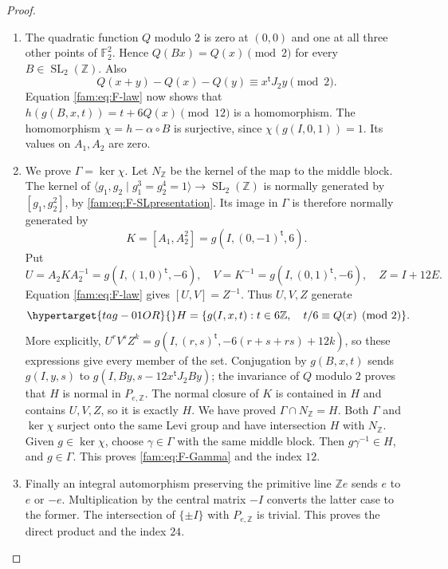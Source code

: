 \begin{proof}
\begin{enumerate}[label=\arabic*.,leftmargin=*]
\item The quadratic function $Q$ modulo $2$ is zero at $(0,0)$ and one at all
three other points of $\mathbb F_2^2$.  Hence $Q(Bx)=Q(x)\pmod2$ for every
$B\in\operatorname{SL}_2(\mathbb Z)$.  Also
\[
 Q(x+y)-Q(x)-Q(y)\equiv x^{\mathsf t}J_2y\pmod2.
\]
Equation \eqref{fam:eq:F-law} now shows that
$h(g(B,x,t))=t+6Q(x)\pmod{12}$ is a homomorphism.
The homomorphism $\chi=h-\alpha\circ B$ is surjective, since
$\chi(g(I,0,1))=1$.  Its values on $A_1,A_2$ are zero.

\item We prove $\Gamma=\ker\chi$.  Let $N_{\mathbb Z}$ be the kernel of the map to the middle
block.  The kernel of
$\langle g_1,g_2\mid g_1^3=g_2^4=1\rangle\to
\operatorname{SL}_2(\mathbb Z)$ is normally generated by
$[g_1,g_2^2]$, by \eqref{fam:eq:F-SLpresentation}.  Its image in $\Gamma$ is
therefore normally generated by
\[
 K=[A_1,A_2^2]=g(I,(0,-1)^{\mathsf t},6).
\]
Put
\[
 U=A_2KA_2^{-1}=g(I,(1,0)^{\mathsf t},-6),\quad
 V=K^{-1}=g(I,(0,1)^{\mathsf t},-6),\quad Z=I+12E.
\]
Equation \eqref{fam:eq:F-law} gives $[U,V]=Z^{-1}$.  Thus $U,V,Z$ generate
\begin{equation}\hypertarget{tag-01OR}{}\label{fam:eq:F-H}
 H=\{g(I,x,t):t\in6\mathbb Z,\quad t/6\equiv Q(x)\pmod2\}.
\end{equation}
More explicitly,
$U^rV^sZ^k=g(I,(r,s)^{\mathsf t},-6(r+s+rs)+12k)$, so these expressions
give every member of the set.  Conjugation by $g(B,x,t)$ sends
$g(I,y,s)$ to $g(I,By,s-12x^{\mathsf t}J_2By)$; the invariance of $Q$
modulo $2$ proves that $H$ is normal in $P_{e,\mathbb Z}$.  The normal
closure of $K$ is contained in $H$ and contains $U,V,Z$, so it is exactly
$H$.  We have proved $\Gamma\cap N_{\mathbb Z}=H$.  Both $\Gamma$ and
$\ker\chi$ surject onto the same Levi group and have intersection $H$
with $N_{\mathbb Z}$.  Given $g\in\ker\chi$, choose $\gamma\in\Gamma$
with the same middle block.  Then $g\gamma^{-1}\in H$, and $g\in\Gamma$.
This proves \eqref{fam:eq:F-Gamma} and the index $12$.

\item Finally an integral automorphism preserving the primitive line
$\mathbb Ze$ sends $e$ to $e$ or $-e$.  Multiplication by the central
matrix $-I$ converts the latter case to the former.  The intersection of
$\{\pm I\}$ with $P_{e,\mathbb Z}$ is trivial.  This proves the direct
product and the index $24$.
\end{enumerate}
\end{proof}

